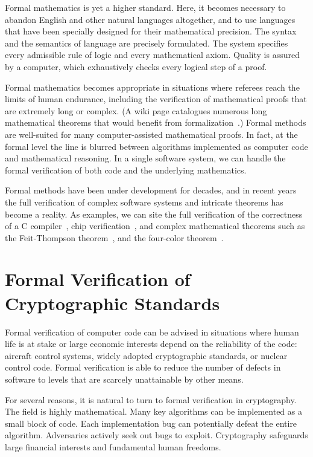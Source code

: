 \documentclass[11pt]{amsart} %
\begin{document}
Formal mathematics is yet a higher standard.   Here,
it becomes necessary to abandon English and other natural languages altogether, 
and to use languages that have been specially designed for their mathematical
precision. The syntax and the semantics of language are precisely formulated.
The system specifies
every admissible rule of logic and  every mathematical axiom.  
Quality is assured by a computer, which exhaustively checks every logical step of a proof.

Formal mathematics becomes appropriate in situations where referees
reach the limits of human endurance, including the verification of mathematical proofs that are extremely
 long or  complex. (A wiki page catalogues numerous long mathematical theorems that would benefit
from formalization~\cite{XX}.)  
Formal methods are well-suited for many computer-assisted mathematical proofs.  
In fact, at the formal level the line is blurred between algorithms implemented as computer code
and mathematical reasoning.  In a single software system, 
we can handle  the formal verification of both code and the underlying mathematics.

Formal methods have been under development for decades, and in recent years the full verification
of complex software systems and intricate theorems has become a reality.  As examples, 
we can site the full
verification of the correctness of a C compiler~\cite{XX}, chip verification~\cite{XX}, 
and complex mathematical theorems such as the Feit-Thompson theorem~\cite{XX}, and the four-color theorem~\cite{XX}.

\section{Formal Verification of Cryptographic Standards}

Formal verification of computer code can be advised in
situations where human life is at stake or large economic interests depend on the reliability of the code:
aircraft control systems, widely adopted cryptographic standards, or nuclear control code.
Formal verification is able to reduce the number of defects in software to levels that are
scarcely unattainable by other means.

For several reasons, it is natural to turn to formal verification in cryptography.
The field is highly mathematical.  Many key algorithms can be implemented as
a small block of code.  Each implementation bug can potentially defeat the entire algorithm.
Adversaries actively seek out bugs to exploit.
Cryptography safeguards
large financial interests and fundamental human freedoms.
\end{document}
